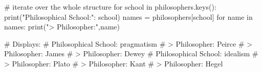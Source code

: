 \begin{pycode}
    # iterate over the whole structure
    for school in philosophers.keys():
        print("Philosophical School:": school)
        names = philosophers[school]
        for name in names:
            print("> Philosopher:",name)

    # Displays:
    # Philosophical School: pragmatism
    # > Philosopher: Peirce
    # > Philosopher: James
    # > Philosopher: Dewey
    # Philosophical School: idealism
    # > Philosopher: Plato
    # > Philosopher: Kant
    # > Philosopher: Hegel
\end{pycode}
